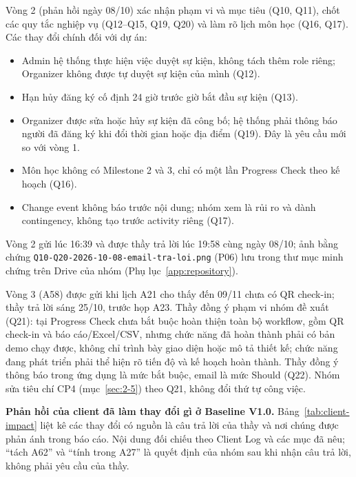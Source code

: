 Vòng 2 (phản hồi ngày 08/10) xác nhận phạm vi và mục tiêu (Q10, Q11), chốt các quy tắc nghiệp vụ (Q12--Q15, Q19, Q20) và làm rõ lịch môn học (Q16, Q17). Các thay đổi chính đối với dự án:
\begin{itemize}
  \item Admin hệ thống thực hiện việc duyệt sự kiện, không tách thêm role riêng; Organizer không được tự duyệt sự kiện của mình (Q12).
  \item Hạn hủy đăng ký cố định 24 giờ trước giờ bắt đầu sự kiện (Q13).
  \item Organizer được sửa hoặc hủy sự kiện đã công bố; hệ thống phải thông báo người đã đăng ký khi đổi thời gian hoặc địa điểm (Q19). Đây là yêu cầu mới so với vòng 1.
  \item Môn học không có Milestone 2 và 3, chỉ có một lần Progress Check theo kế hoạch (Q16).
  \item Change event không báo trước nội dung; nhóm xem là rủi ro và dành contingency, không tạo trước activity riêng (Q17).
\end{itemize}

Vòng 2 gửi lúc 16:39 và được thầy trả lời lúc 19:58 cùng ngày 08/10; ảnh bằng chứng \texttt{Q10-Q20-2026-10-08-email-tra-loi.png} (P06) lưu trong thư mục minh chứng trên Drive của nhóm (Phụ lục~\ref{app:repository}).

Vòng 3 (A58) được gửi khi lịch A21 cho thấy đến 09/11 chưa có QR check-in; thầy trả lời sáng 25/10, trước họp A23. Thầy đồng ý phạm vi nhóm đề xuất (Q21): tại Progress Check chưa bắt buộc hoàn thiện toàn bộ workflow, gồm QR check-in và báo cáo/Excel/CSV, nhưng chức năng đã hoàn thành phải có bản demo chạy được, không chỉ trình bày giao diện hoặc mô tả thiết kế; chức năng đang phát triển phải thể hiện rõ tiến độ và kế hoạch hoàn thành. Thầy đồng ý thông báo trong ứng dụng là mức bắt buộc, email là mức Should (Q22). Nhóm sửa tiêu chí CP4 (mục~\ref{sec:2-5}) theo Q21, không đổi thứ tự công việc.

\textbf{Phản hồi của client đã làm thay đổi gì ở Baseline V1.0.} Bảng~\ref{tab:client-impact} liệt kê các thay đổi có nguồn là câu trả lời của thầy và nơi chúng được phản ánh trong báo cáo. Nội dung đối chiếu theo Client Log và các mục đã nêu; ``tách A62'' và ``tính trong A27'' là quyết định của nhóm sau khi nhận câu trả lời, không phải yêu cầu của thầy.

